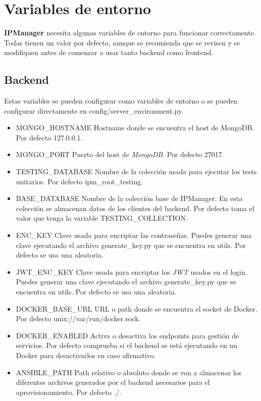 \chapter{Variables de entorno}

\textbf{IPManager} necesita algunas variables de entorno para funcionar correctamente. Todas tienen un valor por defecto, aunque se recomienda que se revisen y se modifiquen antes de comenzar a usar tanto backend como frontend.

\section{Backend}

Estas variables se pueden configurar como variables de entorno o se pueden configurar directamente en \textsf{config/server\_environment.py}.

\begin{itemize}
	\item \textsf{MONGO\_HOSTNAME} Hostname donde se encuentra el host de MongoDB. Por defecto \textsf{127.0.0.1}.
	\item \textsf{MONGO\_PORT} Puerto del host de \textit{MongoDB}. Por defecto \textsf{27017}.
	\item \textsf{TESTING\_DATABASE} Nombre de la colección usada para ejecutar los tests unitarios. Por defecto \textsf{ipm\_root\_testing}.
	\item \textsf{BASE\_DATABASE} Nombre de la colección base de IPManager. En esta colección se almacenan datos de los clientes del backend. Por defecto toma el valor que tenga la variable \textsf{TESTING\_COLLECTION}.
	\item \textsf{ENC\_KEY} Clave usada para encriptar las contraseñas. Puedes generar una clave ejecutando el archivo \textsf{generate\_key.py} que se encuentra en \textsf{utils}. Por defecto se usa una aleatoria.
	\item \textsf{JWT\_ENC\_KEY} Clave usada para encriptar los \textit{JWT} usados en el login. Puedes generar una clave ejecutando el archivo \textsf{generate\_key.py} que se encuentra en \textsf{utils}. Por defecto se usa una aleatoria.
	\item \textsf{DOCKER\_BASE\_URL} URL o path donde se encuentra el socket de Docker. Por defecto \textsf{unix://var/run/docker.sock}.
	\item \textsf{DOCKER\_ENABLED} Activa o desactiva los endpoints para gestión de servicios. Por defecto comprueba si el backend se está ejecutando en un Docker para desactivarlos en caso afirmativo.
	\item \textsf{ANSIBLE\_PATH} Path relativo o absoluto donde se van a almacenar los diferentes archivos generados por el backend necesarios para el aprovisionamiento. Por defecto \textsf{./}.
\end{itemize}


